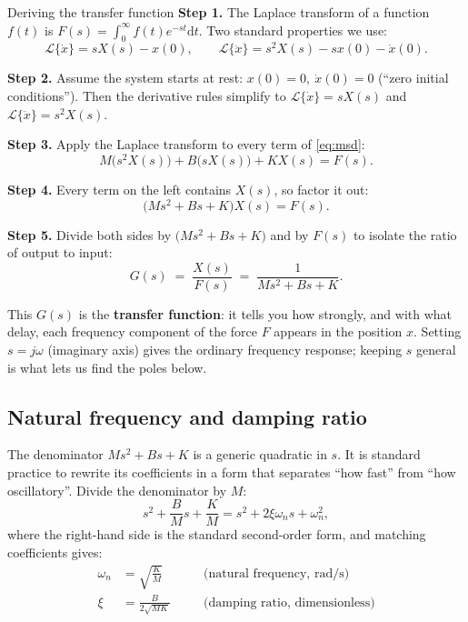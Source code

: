 \documentclass[11pt,a4paper]{article}
\newcommand{\dd}{\mathrm{d}}
\begin{document}
\begin{stepbox}{Deriving the transfer function}
\textbf{Step 1.} The Laplace transform of a function $f(t)$ is
$F(s)=\int_0^\infty f(t)e^{-st}\dd t$. Two standard properties we use:
\[
\mathcal L\{\dot x\} = sX(s) - x(0), \qquad
\mathcal L\{\ddot x\} = s^2 X(s) - s x(0) - \dot x(0).
\]

\textbf{Step 2.} Assume the system starts at rest: $x(0)=0,\ \dot x(0)=0$
(``zero initial conditions''). Then the derivative rules simplify to
$\mathcal L\{\dot x\}=sX(s)$ and $\mathcal L\{\ddot x\}=s^2X(s)$.

\textbf{Step 3.} Apply the Laplace transform to every term of \eqref{eq:msd}:
\[
M\bigl(s^2 X(s)\bigr) + B\bigl(sX(s)\bigr) + K X(s) = F(s).
\]

\textbf{Step 4.} Every term on the left contains $X(s)$, so factor it out:
\[
\bigl(Ms^2 + Bs + K\bigr) X(s) = F(s).
\]

\textbf{Step 5.} Divide both sides by $\bigl(Ms^2+Bs+K\bigr)$ and by $F(s)$ to
isolate the ratio of output to input:
\begin{equation}
G(s) \;=\; \frac{X(s)}{F(s)} \;=\; \frac{1}{Ms^2 + Bs + K}.
\label{eq:secondorderG}
\end{equation}
\end{stepbox}

This $G(s)$ is the \textbf{transfer function}: it tells you how strongly, and
with what delay, each frequency component of the force $F$ appears in the
position $x$. Setting $s=j\omega$ (imaginary axis) gives the ordinary
frequency response; keeping $s$ general is what lets us find the poles below.

\subsection{Natural frequency and damping ratio}

The denominator $Ms^2+Bs+K$ is a generic quadratic in $s$. It is standard
practice to rewrite its coefficients in a form that separates ``how fast''
from ``how oscillatory''. Divide the denominator by $M$:
\[
s^2 + \frac{B}{M}s + \frac{K}{M} = s^2 + 2\xi\omega_n s + \omega_n^2,
\]
where the right-hand side is the standard second-order form, and matching
coefficients gives:
\begin{align}
\omega_n &= \sqrt{\frac{K}{M}} \quad &&\text{(natural frequency, rad/s)} \label{eq:omegan}\\
\xi &= \frac{B}{2\sqrt{MK}} \quad &&\text{(damping ratio, dimensionless)} \label{eq:xi}
\end{align}
\end{document}
